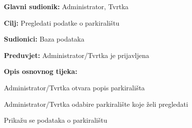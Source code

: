 \noindent {}
\begin{packed_item}
	
	\item \textbf{Glavni sudionik: } Administrator, Tvrtka
	\item \textbf{Cilj:} Pregledati podatke o parkiralištu
	\item \textbf{Sudionici:} Baza podataka
	\item \textbf{Preduvjet:} Administrator/Tvrtka je prijavljena
	\item \textbf{Opis osnovnog tijeka:}
	
	\item[] \begin{packed_enum}
		
		\item Administrator/Tvrtka otvara popis parkirališta
		\item Administrator/Tvrtka odabire parkiralište koje želi pregledati
		\item Prikažu se podataka o parkiralištu
	
	\end{packed_enum}
\end{packed_item}

